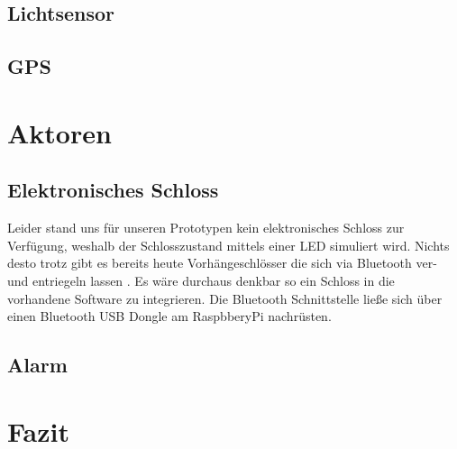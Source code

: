 \documentclass{sigchi}
\begin{document}
\subsection{Lichtsensor}

\subsection{GPS}

\section{Aktoren}

\subsection{Elektronisches Schloss}
Leider stand uns für unseren Prototypen kein elektronisches Schloss
zur Verfügung, weshalb der Schlosszustand mittels einer LED simuliert
wird. Nichts desto trotz gibt es bereits heute Vorhängeschlösser die
sich via Bluetooth ver- und entriegeln lassen \cite{MasterLock:Bluetooth}.
Es wäre durchaus denkbar so ein Schloss in die vorhandene Software
zu integrieren. Die Bluetooth Schnittstelle ließe sich über einen
Bluetooth USB Dongle am RaspbberyPi nachrüsten. 

\subsection{Alarm}

\section{Fazit}

\balance{}



\end{document}
